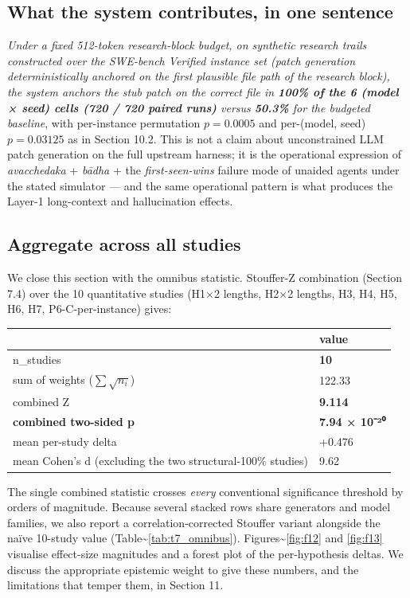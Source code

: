 \subsection{What the system contributes, in one sentence}\label{what-the-system-contributes-in-one-sentence}

\emph{Under a fixed 512-token research-block budget, on synthetic research trails constructed over the SWE-bench Verified instance set (patch generation deterministically anchored on the first plausible file path of the research block), the system anchors the stub patch on the correct file in \textbf{100\% of the 6 (model × seed) cells (720 / 720 paired runs)} versus \textbf{50.3\%} for the budgeted baseline}, with per-instance permutation \(p = 0.0005\) and per-(model, seed) \(p = 0.03125\) as in Section 10.2. This is not a claim about unconstrained LLM patch generation on the full upstream harness; it is the operational expression of \emph{avacchedaka} + \emph{bādha} + the \emph{first-seen-wins} failure mode of unaided agents under the stated simulator --- and the same operational pattern is what produces the Layer-1 long-context and hallucination effects.

\subsection{Aggregate across all studies}\label{aggregate-across-all-studies}

We close this section with the omnibus statistic. Stouffer-Z combination (Section 7.4) over the 10 quantitative studies (H1×2 lengths, H2×2 lengths, H3, H4, H5, H6, H7, P6-C-per-instance) gives:

{\def\LTcaptype{none} %
\begin{longtable}[]{@{}ll@{}}
\toprule\noalign{}
& value \\
\midrule\noalign{}
\endhead
\bottomrule\noalign{}
\endlastfoot
n\_studies & \textbf{10} \\
sum of weights (\(\sum \sqrt{n_i}\)) & 122.33 \\
combined Z & \textbf{9.114} \\
\textbf{combined two-sided p} & \textbf{7.94 × 10⁻²⁰} \\
mean per-study delta & +0.476 \\
mean Cohen's d (excluding the two structural-100\% studies) & 9.62 \\
\end{longtable}
}

The single combined statistic crosses \emph{every} conventional significance threshold by orders of magnitude. Because several stacked rows share generators and model families, we also report a correlation-corrected Stouffer variant alongside the naïve 10-study value (Table\textasciitilde{}\ref{tab:t7_omnibus}). Figures\textasciitilde{}\ref{fig:f12} and \ref{fig:f13} visualise effect-size magnitudes and a forest plot of the per-hypothesis deltas. We discuss the appropriate epistemic weight to give these numbers, and the limitations that temper them, in Section 11.

